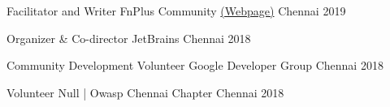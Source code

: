 

\begin{cvhonors}

  \cvhonor
    {Facilitator and Writer}  %
    {FnPlus Community \href{https://www.fnplus.tech/}{(Webpage)}}%
    {Chennai} %
    {2019} %

  \cvhonor
    {Organizer \& Co-director} %
    {JetBrains} %
    {Chennai} %
    {2018} %
    
  \cvhonor
    {Community Development Volunteer} %
    {Google Developer Group} %
    {Chennai} %
    {2018} %


  \cvhonor
    {Volunteer} %
    {Null | Owasp Chennai Chapter} %
    {Chennai} %
    {2018} %


\end{cvhonors}
